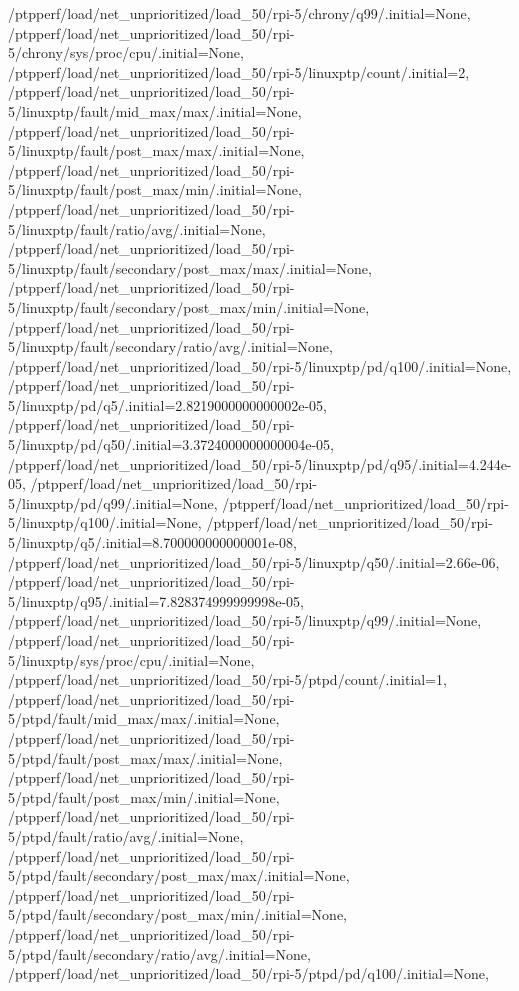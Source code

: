 {    /ptpperf/load/net_unprioritized/load_50/rpi-5/chrony/q99/.initial=None,
    /ptpperf/load/net_unprioritized/load_50/rpi-5/chrony/sys/proc/cpu/.initial=None,
    /ptpperf/load/net_unprioritized/load_50/rpi-5/linuxptp/count/.initial=2,
    /ptpperf/load/net_unprioritized/load_50/rpi-5/linuxptp/fault/mid_max/max/.initial=None,
    /ptpperf/load/net_unprioritized/load_50/rpi-5/linuxptp/fault/post_max/max/.initial=None,
    /ptpperf/load/net_unprioritized/load_50/rpi-5/linuxptp/fault/post_max/min/.initial=None,
    /ptpperf/load/net_unprioritized/load_50/rpi-5/linuxptp/fault/ratio/avg/.initial=None,
    /ptpperf/load/net_unprioritized/load_50/rpi-5/linuxptp/fault/secondary/post_max/max/.initial=None,
    /ptpperf/load/net_unprioritized/load_50/rpi-5/linuxptp/fault/secondary/post_max/min/.initial=None,
    /ptpperf/load/net_unprioritized/load_50/rpi-5/linuxptp/fault/secondary/ratio/avg/.initial=None,
    /ptpperf/load/net_unprioritized/load_50/rpi-5/linuxptp/pd/q100/.initial=None,
    /ptpperf/load/net_unprioritized/load_50/rpi-5/linuxptp/pd/q5/.initial=2.8219000000000002e-05,
    /ptpperf/load/net_unprioritized/load_50/rpi-5/linuxptp/pd/q50/.initial=3.3724000000000004e-05,
    /ptpperf/load/net_unprioritized/load_50/rpi-5/linuxptp/pd/q95/.initial=4.244e-05,
    /ptpperf/load/net_unprioritized/load_50/rpi-5/linuxptp/pd/q99/.initial=None,
    /ptpperf/load/net_unprioritized/load_50/rpi-5/linuxptp/q100/.initial=None,
    /ptpperf/load/net_unprioritized/load_50/rpi-5/linuxptp/q5/.initial=8.700000000000001e-08,
    /ptpperf/load/net_unprioritized/load_50/rpi-5/linuxptp/q50/.initial=2.66e-06,
    /ptpperf/load/net_unprioritized/load_50/rpi-5/linuxptp/q95/.initial=7.828374999999998e-05,
    /ptpperf/load/net_unprioritized/load_50/rpi-5/linuxptp/q99/.initial=None,
    /ptpperf/load/net_unprioritized/load_50/rpi-5/linuxptp/sys/proc/cpu/.initial=None,
    /ptpperf/load/net_unprioritized/load_50/rpi-5/ptpd/count/.initial=1,
    /ptpperf/load/net_unprioritized/load_50/rpi-5/ptpd/fault/mid_max/max/.initial=None,
    /ptpperf/load/net_unprioritized/load_50/rpi-5/ptpd/fault/post_max/max/.initial=None,
    /ptpperf/load/net_unprioritized/load_50/rpi-5/ptpd/fault/post_max/min/.initial=None,
    /ptpperf/load/net_unprioritized/load_50/rpi-5/ptpd/fault/ratio/avg/.initial=None,
    /ptpperf/load/net_unprioritized/load_50/rpi-5/ptpd/fault/secondary/post_max/max/.initial=None,
    /ptpperf/load/net_unprioritized/load_50/rpi-5/ptpd/fault/secondary/post_max/min/.initial=None,
    /ptpperf/load/net_unprioritized/load_50/rpi-5/ptpd/fault/secondary/ratio/avg/.initial=None,
    /ptpperf/load/net_unprioritized/load_50/rpi-5/ptpd/pd/q100/.initial=None,
}
